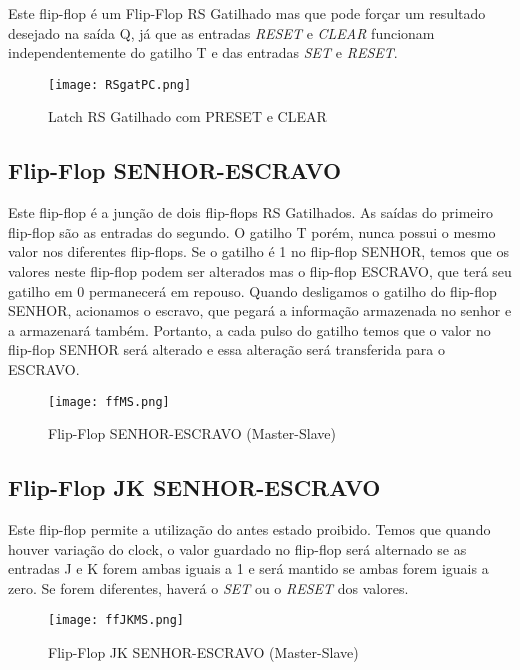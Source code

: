 \documentclass[12pt]{article}
\begin{document}
Este flip-flop é um Flip-Flop RS Gatilhado mas que pode forçar um resultado desejado na saída Q, já que as entradas \textit{RESET} e \textit{CLEAR} funcionam independentemente do gatilho T e das entradas \textit{SET} e \textit{RESET}.

\begin{figure}[H]
	\centering
	\texttt{[image: RSgatPC.png]}
	\caption{Latch RS Gatilhado com PRESET e CLEAR}
	\label{fig:RSgatPC}
\end{figure}

\subsection{Flip-Flop SENHOR-ESCRAVO}

Este flip-flop é a junção de dois flip-flops RS Gatilhados. As saídas do primeiro flip-flop são as entradas do segundo. O gatilho T porém, nunca possui o mesmo valor nos diferentes flip-flops. Se o gatilho é 1 no flip-flop SENHOR, temos que os valores neste flip-flop podem ser alterados mas o flip-flop ESCRAVO, que terá seu gatilho em 0 permanecerá em repouso. Quando desligamos o gatilho do flip-flop SENHOR, acionamos o escravo, que pegará a informação armazenada no senhor e a armazenará também. Portanto, a cada pulso do gatilho temos que o valor no flip-flop SENHOR será alterado e essa alteração será transferida para o ESCRAVO.

\begin{figure}[H]
	\centering
	\texttt{[image: ffMS.png]}
	\caption{Flip-Flop SENHOR-ESCRAVO (Master-Slave)}
	\label{fig:ffMS}
\end{figure} 

\subsection{Flip-Flop JK SENHOR-ESCRAVO}

Este flip-flop permite a utilização do antes estado proibido. Temos que quando houver variação do clock, o valor guardado no flip-flop será alternado se as entradas J e K forem ambas iguais a 1 e será mantido se ambas forem iguais a zero. Se forem diferentes, haverá o \textit{SET} ou o \textit{RESET} dos valores.

\begin{figure}[H]
	\centering
	\texttt{[image: ffJKMS.png]}
	\caption{Flip-Flop JK SENHOR-ESCRAVO (Master-Slave)}
	\label{fig:ffJKMS}
\end{figure} 
\end{document}
